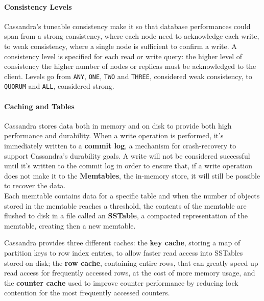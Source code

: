 \paragraph{Consistency Levels} Cassandra's tuneable consistency make it so that database performances could span from a strong consistency, where each node need to acknowledge each write, to weak consistency, where a single node is sufficient to confirm a write. A consistency level is specified for each read or write query: the higher level of consistency the higher number of nodes or replicas must be acknowledged to the client. Levels go from \texttt{ANY}, \texttt{ONE}, \texttt{TWO} and \texttt{THREE}, considered weak consistency, to \texttt{QUORUM} and \texttt{ALL}, considered strong.

\paragraph{Caching and Tables} Cassandra stores data both in memory and on disk to provide both high performance and durability. When a write operation is performed, it’s immediately written to a \textbf{commit log}, a mechanism for crash-recovery to support Cassandra’s durability goals. A write will not be considered successful until it’s written to the commit log in order to ensure that, if a write operation does not make it to  the \textbf{Memtables}, the in-memory store, it will still be possible to recover the data. 
\\Each memtable contains data for a specific table and when the number of objects stored in the memtable reaches a threshold, the contents of the memtable are flushed to disk in a file called an \textbf{SSTable}, a compacted representation of the memtable, creating then a new memtable.

Cassandra provides three different caches: the \textbf{key cache}, storing a map of partition keys to row index entries, to allow faster read access into SSTables stored on disk; the \textbf{row cache}, containing entire rows, that can greatly speed up read access for frequently accessed rows, at the cost of more memory usage, and the \textbf{counter cache} used to improve counter performance by reducing lock contention for the most frequently accessed counters.

